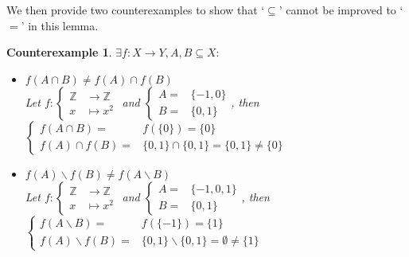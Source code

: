 \documentclass[a4paper]{book}
\theoremstyle{break}
\newtheorem{counterexample}{\hspace{-30pt}\protect\dbend\hspace{15pt}Counterexample}[section]
\begin{document}
			We then provide two counterexamples to show that `$\subseteq$' cannot be improved to `$=$' in this lemma.
			\begin{counterexample}
				{\boldmath $\exists f:X\to Y, A,B\subseteq X:$}
				\begin{itemize}
					\item {\boldmath $f(A\cap B)\neq f(A)\cap f(B)$}\\
					Let $f:\left\{\begin{aligned}\mathbb{Z}&\to\mathbb{Z}\\x&\mapsto x^2\end{aligned}\right.$ and $\left\{\begin{aligned}A=&\{-1,0\}\\ B=&\{0,1\}\end{aligned}\right.$, then $\left\{\begin{aligned}f(A\cap B)=&f(\{0\})=\{0\}\\f(A)\cap f(B)=&\{0,1\}\cap\{0,1\}=\{0,1\}\neq\{0\}\end{aligned}\right.$
					\item {\boldmath $f(A)\backslash f(B)\neq f(A\backslash B)$}\\
					Let $f:\left\{\begin{aligned}\mathbb{Z}&\to\mathbb{Z}\\x&\mapsto x^2\end{aligned}\right.$ and $\left\{\begin{aligned}A=&\{-1,0,1\}\\ B=&\{0,1\}\end{aligned}\right.$, then $\left\{\begin{aligned}f(A\backslash B)=&f(\{-1\})=\{1\}\\f(A)\backslash f(B)=&\{0,1\}\backslash\{0,1\}=\emptyset\neq\{1\}\end{aligned}\right.$
				\end{itemize}
			\end{counterexample}
\end{document}
